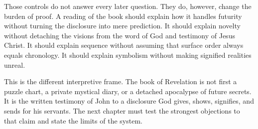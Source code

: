 Those controls do not answer every later question. They do, however, change the burden of proof. A reading of the book should explain how it handles futurity without turning the disclosure into mere prediction. It should explain novelty without detaching the visions from the word of God and testimony of Jesus Christ. It should explain sequence without assuming that surface order always equals chronology. It should explain symbolism without making signified realities unreal.

This is the different interpretive frame. The book of Revelation is not first a puzzle chart, a private mystical diary, or a detached apocalypse of future secrets. It is the written testimony of John to a disclosure God gives, shows, signifies, and sends for his servants. The next chapter must test the strongest objections to that claim and state the limits of the system.
